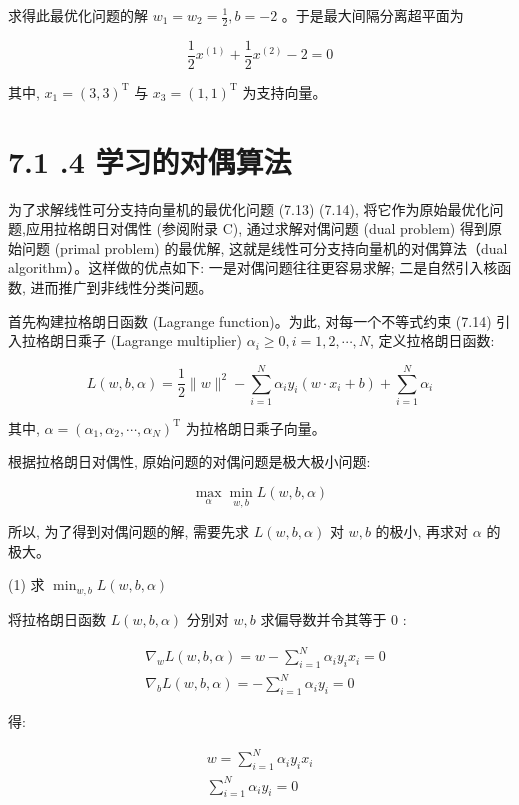 \documentclass[10pt]{article}
\begin{document}
求得此最优化问题的解 $w_{1}=w_{2}=\frac{1}{2}, b=-2$ 。于是最大间隔分离超平面为

$$
\frac{1}{2} x^{(1)}+\frac{1}{2} x^{(2)}-2=0
$$

其中, $x_{1}=(3,3)^{\mathrm{T}}$ 与 $x_{3}=(1,1)^{\mathrm{T}}$ 为支持向量。

\section*{7.1 .4 学习的对偶算法}
为了求解线性可分支持向量机的最优化问题 (7.13) (7.14), 将它作为原始最优化问题,应用拉格朗日对偶性 (参阅附录 C), 通过求解对偶问题 (dual problem) 得到原始问题 (primal problem) 的最优解, 这就是线性可分支持向量机的对偶算法（dual algorithm）。这样做的优点如下: 一是对偶问题往往更容易求解; 二是自然引入核函数, 进而推广到非线性分类问题。

首先构建拉格朗日函数 (Lagrange function)。为此, 对每一个不等式约束 (7.14) 引入拉格朗日乘子 (Lagrange multiplier) $\alpha_{i} \geqslant 0, i=1,2, \cdots, N$, 定义拉格朗日函数:


\begin{equation*}
L(w, b, \alpha)=\frac{1}{2}\|w\|^{2}-\sum_{i=1}^{N} \alpha_{i} y_{i}\left(w \cdot x_{i}+b\right)+\sum_{i=1}^{N} \alpha_{i} \tag{7.18}
\end{equation*}


其中, $\alpha=\left(\alpha_{1}, \alpha_{2}, \cdots, \alpha_{N}\right)^{\mathrm{T}}$ 为拉格朗日乘子向量。

根据拉格朗日对偶性, 原始问题的对偶问题是极大极小问题:

$$
\max _{\alpha} \min _{w, b} L(w, b, \alpha)
$$

所以, 为了得到对偶问题的解, 需要先求 $L(w, b, \alpha)$ 对 $w, b$ 的极小, 再求对 $\alpha$ 的极大。

(1) 求 $\min _{w, b} L(w, b, \alpha)$

将拉格朗日函数 $L(w, b, \alpha)$ 分别对 $w, b$ 求偏导数并令其等于 0 :

$$
\begin{aligned}
& \nabla_{w} L(w, b, \alpha)=w-\sum_{i=1}^{N} \alpha_{i} y_{i} x_{i}=0 \\
& \nabla_{b} L(w, b, \alpha)=-\sum_{i=1}^{N} \alpha_{i} y_{i}=0
\end{aligned}
$$

得:


\begin{gather*}
w=\sum_{i=1}^{N} \alpha_{i} y_{i} x_{i}  \tag{7.19}\\
\sum_{i=1}^{N} \alpha_{i} y_{i}=0 \tag{7.20}
\end{gather*}
\end{document}
